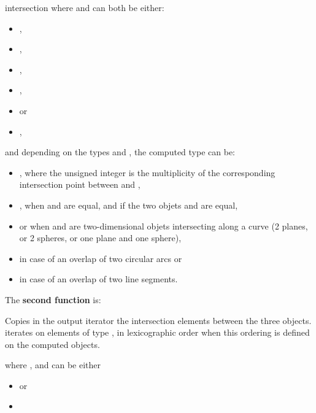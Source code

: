 \begin{ccRefFunction}{intersection}
where  and  can both be either:
\begin{itemize}
\item {} ,
\item {} ,
\item {} ,
\item {} ,
\item {}  or
\item {} ,
\end{itemize} 

and depending on the types  and , the computed 
type can be:
\begin{itemize}
\item {} ,
where the unsigned integer is the multiplicity of the corresponding
intersection point between  and ,
\item {} , when  and  are equal, 
and if the two objets  and  are equal,
\item {}  or 
 when  and  
are two-dimensional objets intersecting along a curve (2 planes, or 2
spheres, or one plane and one sphere),
\item {}  in case of an overlap of 
two circular arcs or
\item {}  in case of an overlap of two 
line segments. 
\end{itemize} 

The \textbf{second function} is:

{Copies in the output iterator the intersection elements between the
three objects.  iterates on
elements of type 
, in lexicographic order when this ordering is defined on the computed objects.}

where ,  and 
can be either
\begin{itemize}
\item {}  or
\item {} 
\end{itemize}


\end{ccRefFunction}

